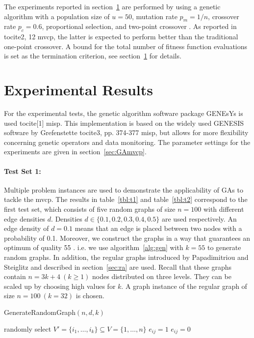 \documentclass[12pt]{article}
\begin{document}
The experiments reported in section~\ref{sec:er} are performed
by using a genetic algorithm with a population size of
$u = 50$, mutation rate $p_m = 1/n$, crossover rate
$p_c = 0.6$, proportional selection, and two-point crossover \cite{mvcp-back}.
As reported in tocite{2, 12 mvcp}, the latter is expected to perform
better than the traditional one-point crossover.
A bound for the total number
of fitness function evaluations is set as the termination
criterion, see section~\ref{sec:er} for details.


\section{Experimental Results}
\label{sec:er}
For the experimental tests,
the genetic algorithm software package GENEsYs is used tocite{[1] misp}.
This implementation is based on the widely used GENESIS software by Grefenstette tocite{3, pp. 374-377 misp},
but allows for more  flexibility concerning genetic operators and data monitoring.
The parameter settings for the experiments are
given in section~\ref{sec:GAmvcp}.

\paragraph{Test Set 1:}
Multiple problem instances are used to demonstrate the applicability of GAs to tackle the mvcp.
The results in table~\ref{tbl:t1}
and table~\ref{tbl:t2} correspond to the first test set, which consists of
five random graphs of size $n = 100$ with different
edge densities $d$.
Densities $d \in \{0.1, 0.2, 0.3, 0.4, 0.5\}$ are used respectively.
An edge density of $d = 0.1$ means that an edge is placed between two
nodes with a probability of 0.1.
Moreover, we construct the graphs in a way that guarantees an optimum of quality 55 \cite{mvcp-back}.
i.e. we use algorithm~\ref{alg:gen} with $k = 55$ to generate random graphs.
In addition, the regular graphs introduced by
Papadimitriou and Steiglitz and described in section~\ref{sec:ra} are used.
Recall that these graphs contain $n=3k+4 \ (k \geq 1)$ nodes distributed on three levels.
They can be scaled up by choosing high values for $k$.
A graph instance of the regular graph of size $n = 100 \  (k=32)$ is chosen.

\begin{algorithm}
\caption{GenerateRandomGraph$(n, d, k)$}
\label{alg:gen}
\begin{algorithmic}[1]


\State randomly select $V' = \{i_1, \dots, i_k\} \subseteq V = \{1, \dots, n\}$
\State
{}
\State $e_{ij} = 1$
\Else
\State $e_{ij} = 0$
\EndIf
\EndFor
\EndFor


\end{algorithmic}
\end{algorithm}
\end{document}
